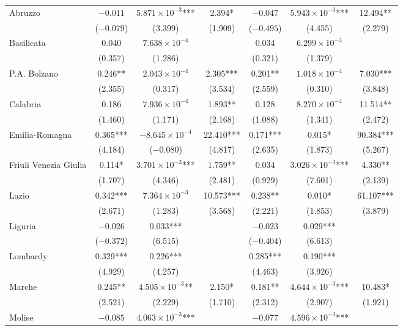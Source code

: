 \documentclass[12pt]{article}
\begin{document}
\begin{longtable}{@{}lcccccc@{}}
        Abruzzo & $-0.011$ & $5.871 \times 10^{-3}$*** & 2.394* & $-0.047$ & $5.943 \times 10^{-3}$*** & 12.494** \\
         & ($-0.079$) & (3.399) & (1.909) & ($-0.495$) & (4.455) & (2.279) \\ 
        Basilicata & 0.040 & $7.638 \times 10^{-4}$ &  & 0.034 & $6.299 \times 10^{-3}$ &  \\ 
         & (0.357) & (1.286) &  & (0.321) & (1.379) &  \\ 
        P.A. Bolzano & 0.246** & $2.043 \times 10^{-4}$ & 2.305*** & 0.201** & $1.018 \times 10^{-4}$ & 7.030*** \\ 
         & (2.355) & (0.317) & (3.534) & (2.559) & (0.310) & (3.848) \\ 
        Calabria & 0.186 & $7.936 \times 10^{-4}$ & 1.893** & 0.128 & $8.270 \times 10^{-4}$ & 11.514** \\ 
         & (1.460) & (1.171) & (2.168) & (1.088) & (1.341) & (2.472) \\ 
        Emilia-Romagna & 0.365*** & $-8.645 \times 10^{-4}$ & 22.410*** & 0.171*** & 0.015* & 90.384*** \\ 
         & (4.184) & ($-0.080$) & (4.817) & (2.635) & (1.873) & (5.267) \\ 
        Friuli Venezia Giulia & 0.114* & $3.701 \times 10^{-3}$*** & 1.759** & 0.034 & $3.026 \times 10^{-3}$*** & 4.330** \\ 
         & (1.707) & (4.346) & (2.481) & (0.929) & (7.601) & (2.139) \\ 
        Lazio &  0.342*** & $7.364 \times 10^{-3}$ & 10.573*** & 0.238** & 0.010* & 61.107*** \\
         & (2.671) & (1.283) & (3.568) & (2.221) & (1.853) & (3.879) \\ 
        Liguria & $-0.026$ & 0.033*** &  & $-0.023$ & 0.029*** &  \\ 
         & ($-0.372$) & (6.515) &  & ($-0.404$) & (6.613) &  \\ 
        Lombardy & 0.329*** & 0.226*** &  & 0.285*** & 0.190*** &  \\ 
         & (4.929) & (4.257) &  & (4.463) & (3.926) &  \\ 
        Marche & 0.245** & $4.505 \times 10^{-3}$** & 2.150* & 0.181** & $4.644 \times 10^{-3}$*** & 10.483* \\ 
         & (2.521) & (2.229) & (1.710) & (2.312) & (2.907) & (1.921) \\ 
        Molise & $-0.085$ & $4.063 \times 10^{-3}$*** &  & $-0.077$ & $4.596 \times 10^{-3}$*** &  \\ 

\end{longtable}
\end{document}
